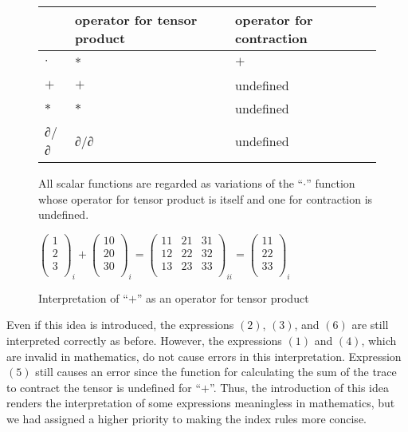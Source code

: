 \documentclass[acmlarge]{acmart}
\begin{document}
\begin{figure}
    \begin{tabular}{ | l | l | l |}
      \hline
      & operator for tensor product & operator for contraction \\ \hline
      $\cdot$ & * & $+$ \\ \hline
      $+$ & $+$ & undefined \\ \hline
      $*$ & $*$ & undefined \\ \hline
      ∂/∂ & ∂/∂ & undefined \\ \hline
    \end{tabular}
  \caption{All scalar functions are regarded as variations of the ``$\cdot$'' function whose operator for tensor product is itself and one for contraction is undefined.}
  \label{fig:tabFunc}
  \medskip
  $\begin{pmatrix} 1 \\ 2 \\ 3 \\ \end{pmatrix}_{i} + \begin{pmatrix} 10 \\ 20 \\ 30 \\ \end{pmatrix}_{i} = \begin{pmatrix} 11 & 21 & 31 \\ 12 & 22 & 32 \\ 13 & 23 & 33 \\ \end{pmatrix}_{ii} = \begin{pmatrix} 11 \\ 22 \\ 33 \\ \end{pmatrix}_{i}$
  \caption{Interpretation of ``$+$'' as an operator for tensor product}
  \label{fig:inPlusIndex}
\end{figure}

Even if this idea is introduced, the expressions $(2)$, $(3)$, and $(6)$ are still interpreted correctly as before.
However, the expressions $(1)$ and $(4)$, which are invalid in mathematics, do not cause errors in this interpretation.
Expression $(5)$ still causes an error since the function for calculating the sum of the trace to contract the tensor is undefined for ``$+$''.
Thus, the introduction of this idea renders the interpretation of some expressions meaningless in mathematics, but we had assigned a higher priority to making the index rules more concise.
\end{document}
